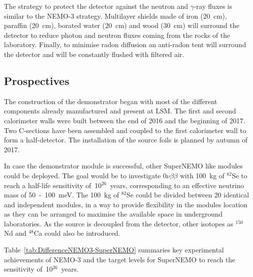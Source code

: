 \documentclass[main.tex]{subfiles}
\begin{document}
\NI The strategy to protect the detector against the neutron and $\gamma$-ray fluxes is similar to the NEMO-3 strategy. Multilayer shields made of iron (20~cm), paraffin (20~cm), borated water (20~cm) and wood (30~cm) will surround the detector to reduce photon and neutron fluxes coming from the rocks of the laboratory. Finally, to minimise radon diffusion an anti-radon tent will surround the detector and will be constantly flushed with filtered air.


\subsection{Prospectives}


\NI The construction of the demonstrator began with most of the different components already manufactured and present at LSM. The first and second calorimeter walls were built between the end of 2016 and the beginning of 2017. Two C-sections have been assembled and coupled to the first calorimeter wall to form a half-detector. The installation of the source foils is planned by autumn of 2017.%

\bigskip


\NI In case the demonstrator module is successful, other SuperNEMO like modules could be deployed. The goal would be to investigate 0$\nu\beta\beta$ with 100~kg of $^{\text{82}}$Se to reach a half-life sensitivity of~10$^{\text{26}}$~years, corresponding to an effective neutrino mass of 50~-~100~meV. The 100~kg of $^{\text{82}}$Se could be divided between 20 identical and independent modules, in a way to provide flexibility in the modules location as they can be arranged to maximise the available space in underground laboratories. As the source is decoupled from the detector, other isotopes as $^{\text{150}}$Nd and $^{\text{48}}$Ca could also be introduced.


\bigskip


\NI Table~\ref{tab:DifferenceNEMO3-SuperNEMO} summaries key experimental achievements of NEMO-3 and the target levels for SuperNEMO to reach the sensitivity of~10$^{\text{26}}$~years. 
\end{document}
